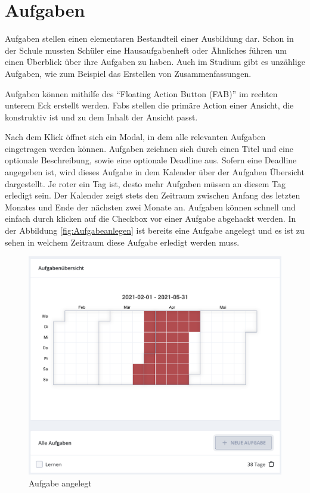 \section{Aufgaben}\label{sec:Aufgaben}
Aufgaben stellen einen elementaren Bestandteil einer Ausbildung dar.
Schon in der Schule mussten Schüler eine Hausaufgabenheft oder Ähnliches führen um einen Überblick über ihre Aufgaben zu haben. Auch im Studium gibt es unzählige Aufgaben, wie zum Beispiel das Erstellen von Zusammenfassungen.

Aufgaben können mithilfe des \enquote{Floating Action Button (FAB)} im rechten unterem Eck erstellt werden. %
Fabs stellen die primäre Action einer Ansicht, die konstruktiv ist und zu dem Inhalt der Ansicht passt.

Nach dem Klick öffnet sich ein Modal, in dem alle relevanten Aufgaben eingetragen werden können.
Aufgaben zeichnen sich durch einen Titel und eine optionale Beschreibung, sowie eine optionale Deadline aus.
Sofern eine Deadline angegeben ist, wird dieses Aufgabe in dem Kalender über der Aufgaben Übersicht dargestellt.
Je roter ein Tag ist, desto mehr Aufgaben müssen an diesem Tag erledigt sein.
Der Kalender zeigt stets den Zeitraum zwischen Anfang des letzten Monates und Ende der nächsten zwei Monate  an.
Aufgaben können schnell und einfach durch klicken auf die Checkbox vor einer Aufgabe abgehackt werden.
In der Abbildung \autoref{fig:Aufgabeanlegen} ist bereits eine Aufgabe angelegt und es ist zu sehen in welchem Zeitraum diese Aufgabe erledigt werden muss.
\begin{figure}[h]
    \centering
    \includegraphics[width=.7\textwidth]{img/Aufgabe_angelegt.png}
    \caption{Aufgabe angelegt}
    \label{fig:Aufgabeanlegen}
\end{figure}




